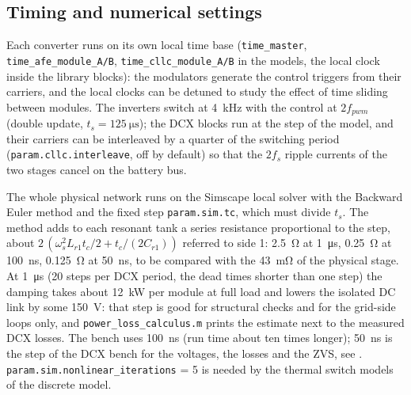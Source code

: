 \documentclass[12pt,a4paper]{scrartcl}
\begin{document}
\begin{onehalfspace}
\subsection{Timing and numerical settings}
\label{sec:bench2026_num}
Each converter runs on its own local time base (\texttt{time\_master}, \texttt{time\_afe\_module\_A/B}, \texttt{time\_cllc\_module\_A/B} in the models, the local clock inside the library blocks): the modulators generate the control triggers from their carriers, and the local clocks can be detuned to study the effect of time sliding between modules. The inverters switch at \SI{4}{\kilo\hertz} with the control at $2 f_{pwm}$ (double update, $t_s = \SI{125}{\micro\second}$); the DCX blocks run at the step of the model, and their carriers can be interleaved by a quarter of the switching period (\texttt{param.cllc.interleave}, off by default) so that the $2 f_s$ ripple currents of the two stages cancel on the battery bus.

The whole physical network runs on the Simscape local solver with the Backward Euler method and the fixed step \texttt{param.sim.tc}, which must divide $t_s$. The method adds to each resonant tank a series resistance proportional to the step, about $2\,(\omega_s^2 L_{r1} t_c/2 + t_c/(2 C_{r1}))$ referred to side 1: \SI{2.5}{\ohm} at \SI{1}{\micro\second}, \SI{0.25}{\ohm} at \SI{100}{\nano\second}, \SI{0.125}{\ohm} at \SI{50}{\nano\second}, to be compared with the \SI{43}{\milli\ohm} of the physical stage. At \SI{1}{\micro\second} (20 steps per DCX period, the dead times shorter than one step) the damping takes about \SI{12}{\kilo\watt} per module at full load and lowers the isolated DC link by some \SI{150}{\volt}: that step is good for structural checks and for the grid-side loops only, and \texttt{power\_loss\_calculus.m} prints the estimate next to the measured DCX losses. The bench uses \SI{100}{\nano\second} (run time about ten times longer); \SI{50}{\nano\second} is the step of the DCX bench for the voltages, the losses and the ZVS, see \cite{cllc_dcx_doc}. \texttt{param.sim.nonlinear\_iterations} = 5 is needed by the thermal switch models of the discrete model.


\end{onehalfspace}
\end{document}
